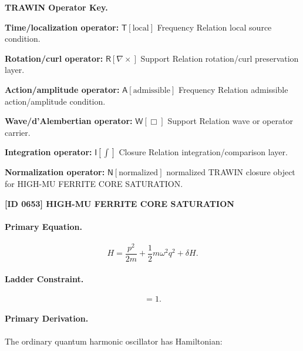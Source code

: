 \par\vspace{0.45\baselineskip}
\noindent\begin{minipage}[t]{\linewidth}
\begingroup
\small
\raggedright
\textbf{TRAWIN Operator Key.}\par
\noindent\textbf{Time/localization operator:} $\mathsf{T}\!\left[\mathrm{local}\right]$ Frequency Relation local source condition.\par
\noindent\textbf{Rotation/curl operator:} $\mathsf{R}\!\left[\nabla\times\right]$ Support Relation rotation/curl preservation layer.\par
\noindent\textbf{Action/amplitude operator:} $\mathsf{A}\!\left[\mathrm{admissible}\right]$ Frequency Relation admissible action/amplitude condition.\par
\noindent\textbf{Wave/d'Alembertian operator:} $\mathsf{W}\!\left[\Box\right]$ Support Relation wave or operator carrier.\par
\noindent\textbf{Integration operator:} $\mathsf{I}\!\left[\int\right]$ Closure Relation integration/comparison layer.\par
\noindent\textbf{Normalization operator:} $\mathsf{N}\!\left[\mathrm{normalized}\right]$ normalized TRAWIN closure object for HIGH-MU FERRITE CORE SATURATION.\par
\endgroup
\end{minipage}

\clearpage
\noindent\textbf{[ID 0653] HIGH-MU FERRITE CORE SATURATION}\par
\vspace{0.35em}
\paragraph{Primary Equation.}
\begin{equation}
H
=
\frac{p^2}{2m}
+
\frac{1}{2}m\omega^2 q^2
+
\delta H .
\end{equation}

\paragraph{Ladder Constraint.}
\begin{equation}
[a,a^\dagger]=1 .
\end{equation}

\paragraph{Primary Derivation.}
The ordinary quantum harmonic oscillator has Hamiltonian:

